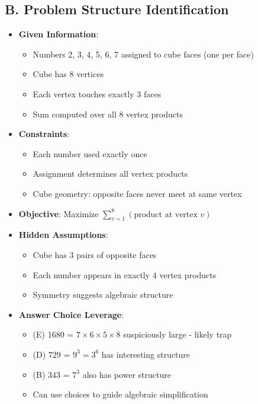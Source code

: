 \documentclass[]{article}
\begin{document}
\begin{problemconfigbox}
\subsection*{B. Problem Structure Identification}
\begin{itemize}[leftmargin=*]
    \item \textbf{Given Information}: 
    \begin{itemize}
        \item Numbers 2, 3, 4, 5, 6, 7 assigned to cube faces (one per face)
        \item Cube has 8 vertices
        \item Each vertex touches exactly 3 faces
        \item Sum computed over all 8 vertex products
    \end{itemize}
    \item \textbf{Constraints}: 
    \begin{itemize}
        \item Each number used exactly once
        \item Assignment determines all vertex products
        \item Cube geometry: opposite faces never meet at same vertex
    \end{itemize}
    \item \textbf{Objective}: Maximize $\sum_{v=1}^{8} (\text{product at vertex } v)$
    \item \textbf{Hidden Assumptions}: 
    \begin{itemize}
        \item Cube has 3 pairs of opposite faces
        \item Each number appears in exactly 4 vertex products
        \item Symmetry suggests algebraic structure
    \end{itemize}
    \item \textbf{Answer Choice Leverage}: 
    \begin{itemize}
        \item (E) 1680 = $7 \times 6 \times 5 \times 8$ suspiciously large - likely trap
        \item (D) 729 = $9^3 = 3^6$ has interesting structure
        \item (B) 343 = $7^3$ also has power structure
        \item Can use choices to guide algebraic simplification
    \end{itemize}
\end{itemize}


\end{problemconfigbox}
\end{document}
